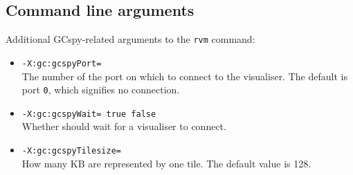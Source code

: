 \subsection{Command line arguments}

Additional GCspy-related arguments to the \texttt{rvm} command:

\begin{itemize}

\item {\tt -X:gc:gcspyPort=} \\
    The number of the port on which to connect to the visualiser.  The
    default is port \texttt{0}, which signifies no connection. 

\item {\tt -X:gc:gcspyWait=\Mlbr{} \mbox{\texttt{true}} \Mor{} \mbox{\texttt{false}} \Mrbr} \\
    Whether \jrvm{} should wait for a visualiser to connect.

\item {\tt -X:gc:gcspyTilesize=} \\
    How many KB are represented by one tile.  The default value is 128.

\end{itemize}

